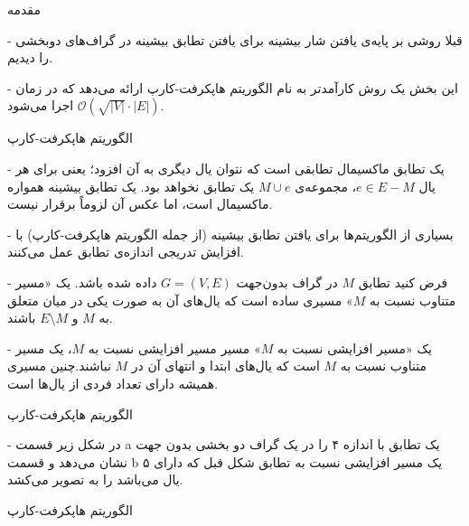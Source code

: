 
\begin{itemframe}{مقدمه}
\item[-]
قبلا روشی بر پایه‌ی یافتن شار بیشینه برای یافتن تطابق بیشینه در گراف‌های دو‌بخشی را دیدیم.
\item[-]
این بخش یک روش کارآمدتر به نام الگوریتم هاپکرفت-کارپ
 ارائه می‌دهد که در زمان
 $\mathcal{O}(\sqrt{|V|} \cdot |E|)$
 اجرا می‌شود.
\end{itemframe}


\begin{itemframe}{الگوریتم هاپکرفت-کارپ}
\item[-]
یک تطابق ماکسیمال
 تطابقی است که نتوان یال دیگری به آن افزود؛ یعنی برای هر یال $e \in E - M$، مجموعه‌ی $M \cup {e}$ یک تطابق نخواهد بود. یک تطابق بیشینه همواره ماکسیمال است، اما عکس آن لزوماً برقرار نیست.

\item[-]
بسیاری از الگوریتم‌ها برای یافتن تطابق بیشینه (از جمله الگوریتم هاپکرفت-کارپ) با افزایش تدریجی اندازه‌ی تطابق عمل می‌کنند.
\item[-]
فرض کنید تطابق $M$ در گراف بدون‌جهت $G = (V, E)$ داده شده باشد. یک «مسیر متناوب نسبت به $M$»
مسیری ساده است که یال‌های آن به صورت یکی در میان متعلق به $M$ و $E \setminus M$ باشند.
\item[-]
یک «مسیر افزایشی نسبت به $M$»
مسیر مسیر افزایشی نسبت به $M$، یک مسیر متناوب نسبت به $M$ است که یال‌های ابتدا و انتهای آن در $M$ نباشند.چنین مسیری همیشه دارای تعداد فردی از یال‌ها است.
\end{itemframe}


\begin{itemframe}{الگوریتم هاپکرفت-کارپ}
\item[-]
در شکل زیر قسمت a یک تطابق با اندازه ۴ را در یک گراف دو بخشی بدون جهت نشان می‌دهد و قسمت b یک مسیر افزایشی نسبت به تطابق شکل قبل که دارای ۵ یال می‌باشد را به تصویر می‌کشد.

\end{itemframe}


\begin{itemframe}{الگوریتم هاپکرفت-کارپ}


\end{itemframe}